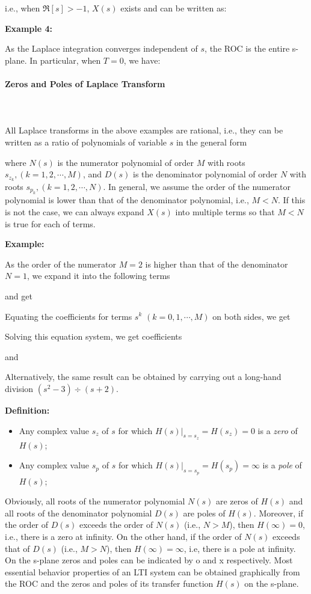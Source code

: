 	i.e., when $\Re[s]>-1$, $X(s)$ exists and can be written as:
	
	
	{\bf Example 4:}
	
	As the Laplace integration converges independent of $s$, the ROC is the 
	entire s-plane. In particular, when $T=0$, we have:
	
	
	\paragraph{Zeros and Poles of Laplace Transform}\mbox{}\\\\
	
	All Laplace transforms in the above examples are rational, i.e., they can 
	be written as a ratio of polynomials of variable $s$ in the general form
	
	where $N(s)$ is the numerator polynomial of order $M$ with roots $s_{z_k}, (k=1,2, 
	\cdots, M)$, and $D(s)$ is the denominator polynomial of order $N$ with roots 
	$s_{p_k}, (k=1,2, \cdots, N)$. In general, we assume the order of the numerator
	polynomial is lower than that of the denominator polynomial, i.e.,  $M < N$. If 
	this is not the case, we can always expand $X(s)$ into multiple terms so that $M<N$
	is true for each of terms.
	
	{\bf Example:}
	
	As the order of the numerator $M=2$ is higher than that of the denominator $N=1$, 
	we expand it into the following terms
	
	and get
	
	Equating the coefficients for terms $s^k$ $(k=0, 1, \cdots, M)$ on both sides, we get
	
	Solving this equation system, we get coefficients
	
	and
	
	Alternatively, the same result can be obtained by carrying out a long-hand division
	$(s^2-3) \div (s+2)$.
	
	{\bf Definition: } 
	\begin{itemize}
	\item Any complex value $s_z$ of $s$ for which $H(s)|_{s=s_z}=H(s_z)=0$ is a 
		{\em zero} of $H(s)$;
	\item Any complex value $s_p$ of $s$ for which $H(s)|_{s=s_p}=H(s_p)=\infty$ is a 
		{\em pole} of $H(s)$;
	\end{itemize}
	
	Obviously, all roots of the numerator polynomial $N(s)$ are zeros of $H(s)$ and 
	all roots of the denominator polynomial $D(s)$ are poles of $H(s)$. Moreover, if 
	the order of $D(s)$ exceeds the order of $N(s)$ (i.e., $N>M$), then $H(\infty)=0$,
	i.e., there is a zero at infinity. On the other hand, if the order of $N(s)$ exceeds
	that of $D(s)$ (i.e., $M>N$), then $H(\infty)=\infty$, i.e, there is a pole at
	infinity. On the s-plane zeros and poles can be indicated by o and x respectively. 
	Most essential behavior properties of an LTI system can be obtained graphically
	from the ROC and the zeros and poles of its transfer function $H(s)$ on the s-plane.
	
